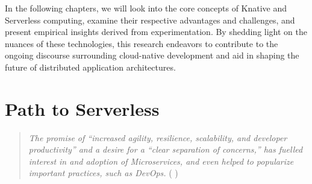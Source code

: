 \documentclass{article}
\begin{document}
\begin{flushleft}
In the following chapters, we will look into the core concepts of Knative and Serverless computing, examine their respective advantages and challenges, and present empirical insights derived from experimentation. By shedding light on the nuances of these technologies, this research endeavors to contribute to the ongoing discourse surrounding cloud-native development and aid in shaping the future of distributed application architectures.
\end{flushleft}


\section{Path to Serverless}
\begin{quote}
    \textit{The promise of “increased agility, resilience, scalability, and developer productivity” and a desire for a “clear separation of concerns,” has fuelled interest in and adoption of Microservices, and even helped to popularize important practices, such as DevOps.}  ( \cite{KillaleaTom-2016} )
\end{quote}
\end{document}

